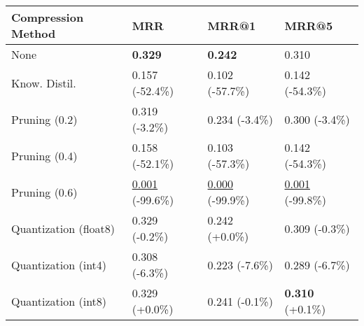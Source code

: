 \begin{tabular}{llll}
\toprule
\textbf{Compression Method} & \textbf{MRR} & \textbf{MRR@1} & \textbf{MRR@5} \\
\midrule
None & \textbf{0.329} & \textbf{0.242} & 0.310 \\
Know. Distil. & 0.157 (-52.4\%) & 0.102 (-57.7\%) & 0.142 (-54.3\%) \\
Pruning (0.2) & 0.319 (-3.2\%) & 0.234 (-3.4\%) & 0.300 (-3.4\%) \\
Pruning (0.4) & 0.158 (-52.1\%) & 0.103 (-57.3\%) & 0.142 (-54.3\%) \\
Pruning (0.6) & \underline{0.001} (-99.6\%) & \underline{0.000} (-99.9\%) & \underline{0.001} (-99.8\%) \\
Quantization (float8) & 0.329 (-0.2\%) & 0.242 (+0.0\%) & 0.309 (-0.3\%) \\
Quantization (int4) & 0.308 (-6.3\%) & 0.223 (-7.6\%) & 0.289 (-6.7\%) \\
Quantization (int8) & 0.329 (+0.0\%) & 0.241 (-0.1\%) & \textbf{0.310} (+0.1\%) \\
\bottomrule
\end{tabular}
